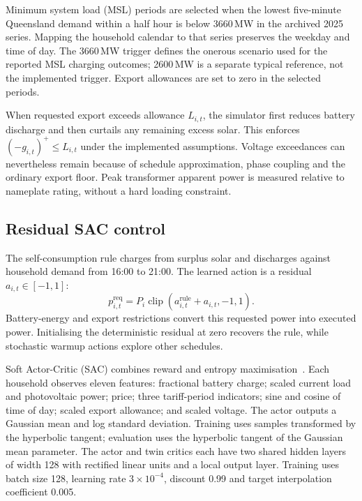 \documentclass[preprint,12pt,a4paper]{elsarticle}
\begin{document}
Minimum system load (MSL) periods are selected when the lowest five-minute Queensland demand within a half hour is below 3660\,MW in the archived 2025 series. Mapping the household calendar to that series preserves the weekday and time of day. The 3660\,MW trigger defines the onerous scenario used for the reported MSL charging outcomes; 2600\,MW is a separate typical reference, not the implemented trigger. Export allowances are set to zero in the selected periods.

When requested export exceeds allowance $L_{i,t}$, the simulator first reduces battery discharge and then curtails any remaining excess solar. This enforces $(-g_{i,t})^+\leq L_{i,t}$ under the implemented assumptions. Voltage exceedances can nevertheless remain because of schedule approximation, phase coupling and the ordinary export floor. Peak transformer apparent power is measured relative to nameplate rating, without a hard loading constraint.

\subsection{Residual SAC control}
The self-consumption rule charges from surplus solar and discharges against household demand from 16:00 to 21:00. The learned action is a residual $a_{i,t}\in[-1,1]$:
\begin{equation}
p^{\mathrm{req}}_{i,t}=P_i\operatorname{clip}\left(a^{\mathrm{rule}}_{i,t}+a_{i,t},-1,1\right).
\end{equation}
Battery-energy and export restrictions convert this requested power into executed power. Initialising the deterministic residual at zero recovers the rule, while stochastic warmup actions explore other schedules.

Soft Actor-Critic (SAC) combines reward and entropy maximisation~\cite{sac,sacapps}. Each household observes eleven features: fractional battery charge; scaled current load and photovoltaic power; price; three tariff-period indicators; sine and cosine of time of day; scaled export allowance; and scaled voltage. The actor outputs a Gaussian mean and log standard deviation. Training uses samples transformed by the hyperbolic tangent; evaluation uses the hyperbolic tangent of the Gaussian mean parameter. The actor and twin critics each have two shared hidden layers of width 128 with rectified linear units and a local output layer. Training uses batch size 128, learning rate $3\times10^{-4}$, discount 0.99 and target interpolation coefficient 0.005.
\end{document}
